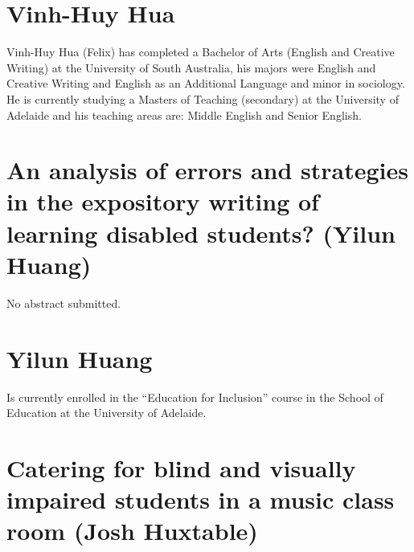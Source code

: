 \documentclass[twoside,14pt,a4paper,notitlepage]{memoir}
\begin{document}
\section*{Vinh-Huy Hua}

Vinh-Huy Hua (Felix) has completed a Bachelor of Arts (English and Creative Writing) at the University of South Australia, his majors were English and Creative Writing and English as an Additional Language and minor in sociology. He is currently studying a Masters of Teaching (secondary) at the University of Adelaide and his teaching areas are: Middle English and Senior English.



\section*{An analysis of errors and strategies in the expository writing of learning disabled students? (Yilun Huang)}
\label{aut:huang}

No abstract submitted.

\section*{Yilun Huang}

Is currently enrolled in the ``Education for Inclusion'' course in the School of Education at the University of Adelaide.



\section*{Catering for blind and visually impaired students in a music class room (Josh Huxtable)}
\label{aut:huxtable}
\end{document}

